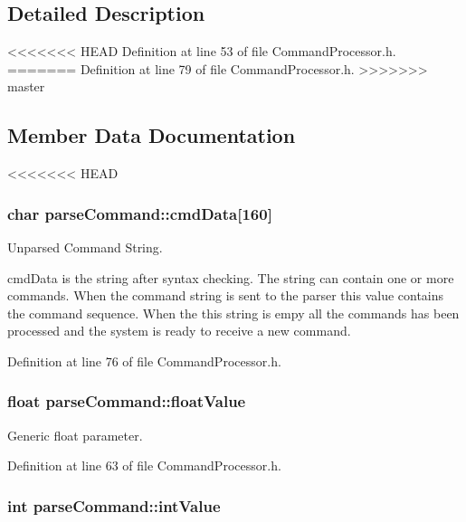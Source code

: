\subsection{Detailed Description}


<<<<<<< HEAD
Definition at line 53 of file Command\-Processor.\-h.
=======
Definition at line 79 of file Command\-Processor.\-h.
>>>>>>> master



\subsection{Member Data Documentation}
<<<<<<< HEAD
\hypertarget{structparse_command_a7cb5165cf18cc63d7eed9fa34be4efd8}{
\subsubsection[{cmd\-Data}]{\setlength{\rightskip}{0pt plus 5cm}char parse\-Command\-::cmd\-Data\mbox{[}160\mbox{]}}}\label{structparse_command_a7cb5165cf18cc63d7eed9fa34be4efd8}


Unparsed Command String. 

cmd\-Data is the string after syntax checking. The string can contain one or more commands. When the command string is sent to the parser this value contains the command sequence. When the this string is empy all the commands has been processed and the system is ready to receive a new command. 

Definition at line 76 of file Command\-Processor.\-h.

\hypertarget{structparse_command_a121ded5fdf791ba216ad84cef651fe74}{
\subsubsection[{float\-Value}]{\setlength{\rightskip}{0pt plus 5cm}float parse\-Command\-::float\-Value}}\label{structparse_command_a121ded5fdf791ba216ad84cef651fe74}


Generic float parameter. 



Definition at line 63 of file Command\-Processor.\-h.

\hypertarget{structparse_command_a022bdea84dc5c07ff20af8690a1aa2e3}{
\subsubsection[{int\-Value}]{\setlength{\rightskip}{0pt plus 5cm}int parse\-Command\-::int\-Value}}\label{structparse_command_a022bdea84dc5c07ff20af8690a1aa2e3}


